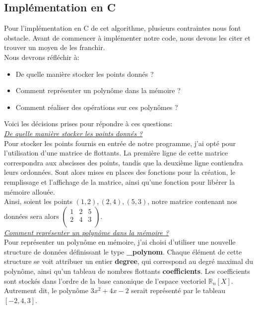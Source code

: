 \subsection{Implémentation en C}
Pour l'implémentation en C de cet algorithme, plusieurs contraintes nous font obstacle. Avant de commencer à implémenter notre code, nous devons les citer et trouver un moyen de les franchir.\vspace{6pt}\\
Nous devrons réfléchir à:
\begin{itemize}
    \item De quelle manière stocker les points donnés ?
    \item Comment représenter un polynôme dans la mémoire ?
    \item Comment réaliser des opérations sur ces polynômes ?\vspace{4pt}\\
\end{itemize}
\label{header}
Voici les décisions prises pour répondre à ces questions:\vspace{4pt}\\
\underline{\textit{De quelle manière stocker les points donnés ?}}\vspace{4pt}\\
Pour stocker les points fournis en entrée de notre programme, j'ai opté pour l'utilisation d'une matrice de flottants. La première ligne de cette matrice correspondra aux abscisses des points, tandis que la deuxième ligne contiendra leurs ordonnées. Sont alors mises en places des fonctions pour la création, le remplissage et l'affichage de la matrice, ainsi qu'une fonction pour libérer la mémoire allouée.\vspace{6pt}\\
Ainsi, soient les points $(1,2), (2,4), (5,3)$, notre matrice contenant nos données sera alors $\begin{pmatrix}
    1&2&5\\
    2&4&3\\
\end{pmatrix}$.\\
\underline{\textit{Comment représenter un polynôme dans la mémoire ?}}\vspace{4pt}\\
Pour représenter un polynôme en mémoire, j'ai choisi d'utiliser une nouvelle structure de données définissant le type \textbf{\_polynom}. Chaque élément de cette structure se voit attribuer un entier \textbf{degree}, qui correspond au degré maximal du polynôme, ainsi qu'un tableau de nombres flottants \textbf{coefficients}. Les coefficients sont stockés dans l'ordre de la base canonique de l'espace vectoriel $\mathbb{R}_n[X]$. Autrement dit, le polynôme $3x^2 + 4x - 2$ serait représenté par le tableau $[-2, 4, 3]$.\vspace{4pt}\\

